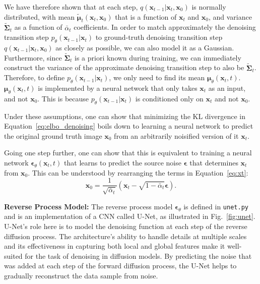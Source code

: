 \documentclass[11pt,addpoints,answers]{exam}
\newcommand{\xv}{\mathbf{x}}
\newcommand{\epsilonv   }{\boldsymbol \epsilon   }
\newcommand{\muv        }{\boldsymbol \mu        }
\begin{document}
\begin{questions}
    We have therefore shown that at each step, 
 $q(\xv_{t-1} | \xv_t, \xv_0)$ is normally distributed, with mean $\tilde{\muv}_t(\xv_t, \xv_0)$
 that is a function of $\xv_t$ and $\xv_0$, and variance $\tilde{\boldsymbol{\Sigma}}_t$ as a function of $\bar\alpha_{t}$ coefficients. In order to match approximately the denoising transition step $p_\theta(\xv_{t-1}|\xv_t)$
 to ground-truth denoising transition step $q(\xv_{t-1} | \xv_t, \xv_0)$
 as closely as possible, we can also model it as a Gaussian. Furthermore, since $\tilde{\boldsymbol{\Sigma}}_t$ is a priori known during training, we can immediately construct the variance of the approximate denoising transition step to also be 
$\tilde{\boldsymbol{\Sigma}}_t$. Therefore, to define $p_\theta(\xv_{t-1}|\xv_t)$, we only need to find its mean $\boldsymbol{\mu}_\theta(\xv_t, t)$. $\boldsymbol{\mu}_\theta(\xv_t, t)$ is implemented by a neural network that only takes $\xv_t$ as an input, and not $\xv_0$. This is because $p_\theta(\xv_{t-1}|\xv_t)$ is conditioned only on $\xv_t$ and not $\xv_0$.
    \par
Under these assumptions, one can show that minimizing the KL divergence in Equation~\ref{eq:elbo_denoising} boils down to learning a neural network to predict the original ground truth image $\xv_0$ from an arbitrarily noisified version of it $\xv_t$. 

Going one step further, one can show that this is equivalent to training a neural network $\boldsymbol{\epsilon}_\theta(\xv_t,t)$ that learns to predict the source noise $\boldsymbol{\epsilon}$
 that determines $\xv_t$
 from $\xv_0$. This can be understood by rearranging the terms in Equation~\ref{eq:xt}: 
\begin{equation}
        \xv_0 = \frac{1}{\sqrt{\bar{\alpha}_t}} \left( \xv_t - \sqrt{1 - \bar{\alpha}_t} \epsilonv \right).
\end{equation}

    \textbf{Reverse Process Model:} The reverse process model $\boldsymbol{\epsilon}_\theta$ is defined in \lstinline{unet.py} and is an implementation of a CNN called U-Net, as illustrated in Fig.~\ref{fig:unet}. 
    U-Net's role here is to model the denoising function at each step of the reverse diffusion process. The architecture's ability to handle details at multiple scales and its effectiveness in capturing both local and global features make it well-suited for the task of denoising in diffusion models. By predicting the noise that was added at each step of the forward diffusion process, the U-Net helps to gradually reconstruct the data sample from noise.
    

\end{questions}
\end{document}
